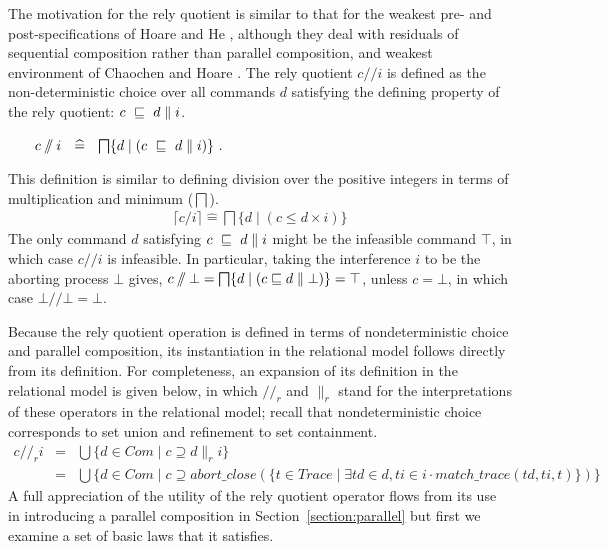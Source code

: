 \documentclass[fleqn]{fac}
\newcommand{\sdefs}{\mathrel{\widehat=}}\newcommand{\spot}{\mathrel{{\cdot}}}\newcommand{\where}{\mathrel{|}}\renewcommand{\implies}{\mathrel{\Rightarrow}}\newcommand{\emptyrel}{\emptyset}
\newcommand{\Command}{\mathit{Com}}
\newcommand{\Nondet}{\mathop{\textstyle\bigsqcap}}
\newcommand{\quotient}{\mathbin{/\!\!/}}
\newcommand{\Trace}{\mathit{Trace}}
\newcommand{\Keyword}[1]{\mathsf{\mathbf{#1}}}
\newcommand{\Magic}{\Keyword{\top}}
\newcommand{\Abort}{\Keyword{\bot}}
\begin{document}
The motivation for the rely quotient is similar to that for 
the weakest pre- and post-specifications of Hoare and He \cite{HoareHe86},
although they deal with residuals of sequential composition rather than parallel composition,
and
weakest environment of Chaochen and Hoare \cite{ChaochenHoare81,Chaochen:1982}.
The rely quotient $c \quotient i$ is defined as the non-deterministic choice over all commands
$d$ satisfying the defining property of the rely quotient:
$c ~\mathrel{\sqsubseteq}~ d \parallel i$.
\begin{definitionx}~~~
\(
  c \quotient i ~~\sdefs~~ \Nondet \{ d \where (c ~\refsto~ d \parallel i) \}~.
\)
\end{definitionx}
This definition is similar to defining division over the positive integers in terms of multiplication
and minimum ($\Nondet$).
\begin{eqnarray*}
  \lceil c/i \rceil \sdefs \Nondet \{ d \where (c \leq d \times i) \}
\end{eqnarray*}
The only command $d$ satisfying $c ~\mathrel{\sqsubseteq}~ d \parallel i$ might be the infeasible command $\Magic$,
in which case $c \quotient i$ is infeasible.
In particular, taking the interference $i$ to be the aborting process $\Abort$ gives,
$c \quotient \Abort = \Nondet \{ d \where (c \refsto d \parallel \Abort) \} = \Magic$,
unless $c = \Abort$, in which case $\Abort \quotient \Abort = \Abort$.

Because the rely quotient operation is defined in terms of nondeterministic choice and parallel composition,
its instantiation in the relational model follows directly from its definition.
For completeness, an expansion of its definition in the relational model is given below,
in which $\quotient_{\!r}$ and $\parallel_r$ stand for the interpretations of these operators in the relational model;
recall that nondeterministic choice corresponds to set union and refinement to set containment.
\begin{eqnarray*}
  c \quotient_{\!r} i & = & \bigcup \{ d \in \Command \where c \supseteq d \parallel_r i \} \\
    & = & \bigcup \{ d \in \Command \where c \supseteq abort\_close(\{ t \in \Trace \where \exists td \in d, ti \in i \spot match\_trace(td,ti,t) \}) \} 
\end{eqnarray*}
A full appreciation of the utility of the rely quotient operator flows from its use in 
introducing a parallel composition in Section~\ref{section:parallel}
but first we examine a set of basic laws that it satisfies.
\end{document}
